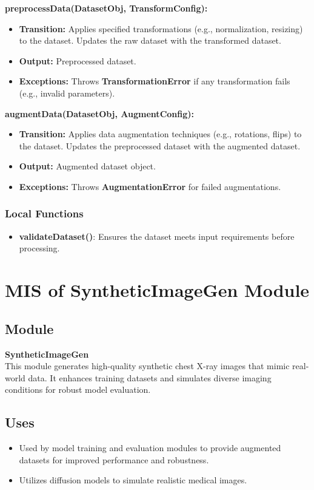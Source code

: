 \documentclass[12pt, titlepage]{article}
\begin{document}
\noindent \textbf{preprocessData(DatasetObj, TransformConfig):}
\begin{itemize}
    \item \textbf{Transition:} Applies specified transformations (e.g., normalization, resizing) to the dataset. Updates the raw dataset with the transformed dataset.
    \item \textbf{Output:} Preprocessed dataset.
    \item \textbf{Exceptions:} Throws \textbf{TransformationError} if any transformation fails (e.g., invalid parameters).
\end{itemize}

\noindent \textbf{augmentData(DatasetObj, AugmentConfig):}
\begin{itemize}
    \item \textbf{Transition:} Applies data augmentation techniques (e.g., rotations, flips) to the dataset. Updates the preprocessed dataset with the augmented dataset.
    \item \textbf{Output:} Augmented dataset object.
    \item \textbf{Exceptions:} Throws \textbf{AugmentationError} for failed augmentations.
\end{itemize}

\subsubsection{Local Functions}
\begin{itemize}
    \item \textbf{validateDataset()}: Ensures the dataset meets input requirements before processing.
\end{itemize}
\newpage

\section{MIS of SyntheticImageGen Module} \label{mSyntheticImageGen}

\subsection{Module}
\textbf{SyntheticImageGen} \\
This module generates high-quality synthetic chest X-ray images that mimic real-world data. It enhances training datasets and simulates diverse imaging conditions for robust model evaluation.

\subsection{Uses}
\begin{itemize}
    \item Used by model training and evaluation modules to provide augmented datasets for improved performance and robustness.
    \item Utilizes diffusion models to simulate realistic medical images.
\end{itemize}
\end{document}
